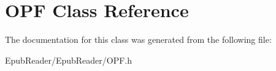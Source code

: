 \hypertarget{interface_o_p_f}{\section{O\-P\-F Class Reference}
\label{interface_o_p_f}
}


The documentation for this class was generated from the following file\-:\begin{DoxyCompactItemize}
\item 
Epub\-Reader/\-Epub\-Reader/O\-P\-F.\-h\end{DoxyCompactItemize}

